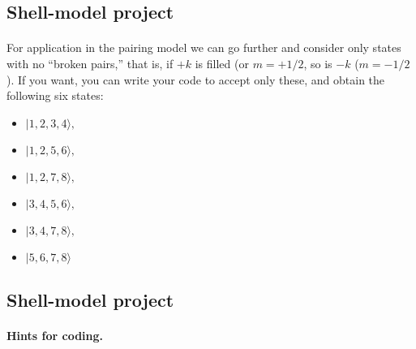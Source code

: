 \documentclass[%
oneside,                 %
final,                   %
10pt]{article}
\begin{document}
\subsection*{Shell-model project}

\paragraph{}

For application in the pairing model we can go further and consider only states with 
no ``broken pairs,'' that is, if $+k$ is filled (or $m = +1/2$, so is $-k$ ($m=-1/2$). 
If you want, you can write your code to accept only these, and obtain the following 
six states:

\begin{itemize}
\item $|           1,           2 ,          3         ,       4  \rangle , $

\item $|            1      ,     2        ,        5         ,       6 \rangle , $

\item $|            1         ,       2     ,           7         ,       8  \rangle , $

\item $|            3        ,        4      ,          5          ,      6  \rangle , $

\item $|            3        ,        4      ,          7         ,       8  \rangle , $

\item $|            5        ,        6     ,           7     ,           8  \rangle $
\end{itemize}

\noindent



\subsection*{Shell-model project}

\paragraph{Hints for coding.}
\end{document}
